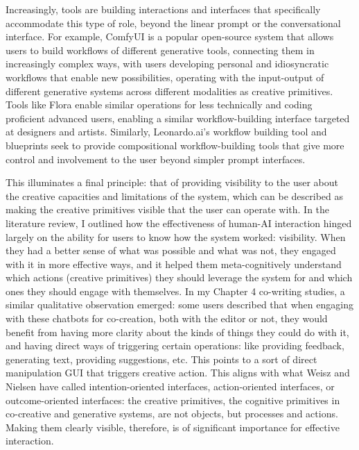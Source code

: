 Increasingly, tools are building interactions and interfaces that specifically accommodate this type of role, beyond the linear prompt or the conversational interface. For example, ComfyUI is a popular open-source system that allows users to build workflows of different generative tools, connecting them in increasingly complex ways, with users developing personal and idiosyncratic workflows that enable new possibilities, operating with the input-output of different generative systems across different modalities as creative primitives. Tools like Flora enable similar operations for less technically and coding proficient advanced users, enabling a similar workflow-building interface targeted at designers and artists. Similarly, Leonardo.ai's workflow building tool and blueprints seek to provide compositional workflow-building tools that give more control and involvement to the user beyond simpler prompt interfaces.

This illuminates a final principle: that of providing visibility to the user about the creative capacities and limitations of the system, which can be described as making the creative primitives visible that the user can operate with. In the literature review, I outlined how the effectiveness of human-AI interaction hinged largely on the ability for users to know how the system worked: visibility. When they had a better sense of what was possible and what was not, they engaged with it in more effective ways, and it helped them meta-cognitively understand which actions (creative primitives) they should leverage the system for and which ones they should engage with themselves. In my Chapter 4 co-writing studies, a similar qualitative observation emerged: some users described that when engaging with these chatbots for co-creation, both with the editor or not, they would benefit from having more clarity about the kinds of things they could do with it, and having direct ways of triggering certain operations: like providing feedback, generating text, providing suggestions, etc. This points to a sort of direct manipulation GUI that triggers creative action. This aligns with what Weisz and Nielsen have called intention-oriented interfaces, action-oriented interfaces, or outcome-oriented interfaces: the creative primitives, the cognitive primitives in co-creative and generative systems, are not objects, but processes and actions. Making them clearly visible, therefore, is of significant importance for effective interaction.


